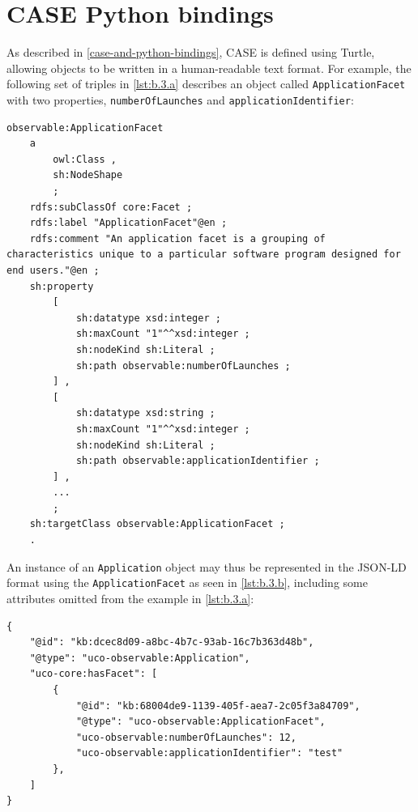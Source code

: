 \documentclass[letterpaper,12pt]{report}
\newcommand{\passthrough}[1]{#1}
\begin{document}
\section{CASE Python bindings}\label{case-python-bindings}

As described in \autoref{case-and-python-bindings}, CASE is defined using Turtle, allowing objects to be
written in a human-readable text format. For example, the following set
of triples in \autoref{lst:b.3.a} describes an object called
\passthrough{\lstinline!ApplicationFacet!} with two properties,
\passthrough{\lstinline!numberOfLaunches!} and
\passthrough{\lstinline!applicationIdentifier!}:

\begin{lstlisting}[label={lst:b.3.a}, caption={Example CASE object definition for applications \cite{UcoProjectUCO2025}}, ]
observable:ApplicationFacet
    a
        owl:Class ,
        sh:NodeShape
        ;
    rdfs:subClassOf core:Facet ;
    rdfs:label "ApplicationFacet"@en ;
    rdfs:comment "An application facet is a grouping of characteristics unique to a particular software program designed for end users."@en ;
    sh:property
        [
            sh:datatype xsd:integer ;
            sh:maxCount "1"^^xsd:integer ;
            sh:nodeKind sh:Literal ;
            sh:path observable:numberOfLaunches ;
        ] ,
        [
            sh:datatype xsd:string ;
            sh:maxCount "1"^^xsd:integer ;
            sh:nodeKind sh:Literal ;
            sh:path observable:applicationIdentifier ;
        ] ,
        ...
        ;
    sh:targetClass observable:ApplicationFacet ;
    .
\end{lstlisting}

An instance of an \passthrough{\lstinline!Application!} object may thus
be represented in the JSON-LD format using the
\passthrough{\lstinline!ApplicationFacet!} as seen in
\autoref{lst:b.3.b}, including some attributes omitted from the example
in \autoref{lst:b.3.a}:

\begin{lstlisting}[label={lst:b.3.b}, caption={Instantiated CASE application object as JSON-LD }, ]
{
    "@id": "kb:dcec8d09-a8bc-4b7c-93ab-16c7b363d48b",
    "@type": "uco-observable:Application",
    "uco-core:hasFacet": [
        {
            "@id": "kb:68004de9-1139-405f-aea7-2c05f3a84709",
            "@type": "uco-observable:ApplicationFacet",
            "uco-observable:numberOfLaunches": 12,
            "uco-observable:applicationIdentifier": "test"
        },
    ]
}
\end{lstlisting}
\end{document}
